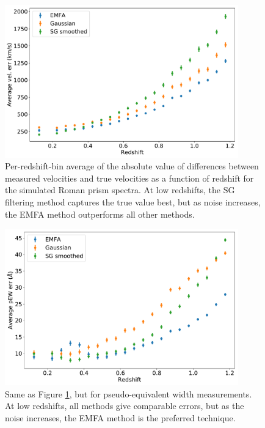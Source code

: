 \begin{figure}[htbp]
    \centering
    \includegraphics[width=0.9\textwidth]{figures/si_feat_pca/wfirst_vel_err.pdf}
    \caption{Per-redshift-bin average of the absolute value of differences between measured velocities and true velocities as a function of redshift for the simulated Roman prism spectra. At low redshifts, the SG filtering method captures the true value best, but as noise increases, the EMFA method outperforms all other methods.}
    \label{wfirst_vel_err_vs_z}
\end{figure}

\begin{figure}[htbp]
    \centering
    \includegraphics[width=0.9\textwidth]{figures/si_feat_pca/wfirst_pew_err.pdf}
    \caption{Same as Figure \ref{wfirst_vel_err_vs_z}, but for pseudo-equivalent width measurements. At low redshifts, all methods give comparable errors, but as the noise increases, the EMFA method is the preferred technique.}
    \label{wfirst_ew_err_vs_z}
\end{figure}

